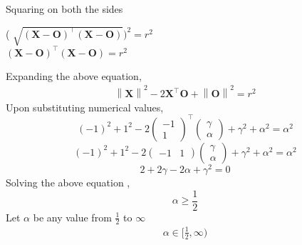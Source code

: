 \documentclass[10pt,a4paper]{report}
\newcommand{\myvec}[1]{\ensuremath{\begin{pmatrix}#1\end{pmatrix}}}
\let\vec\mathbf
\providecommand{\norm}[1]{\left\lVert#1\right\rVert}
\let\vec\mathbf
\providecommand{\brak}[1]{\ensuremath{\left(#1\right)}}
\begin{document}
\begin{multicols}{2}
{Squaring on both the sides \\ \vspace{2mm}
\begin{center}
( $ \sqrt{(\vec{X}-\vec{O})^{\top}(\vec{X}-\vec{O})} )^2 = r^2 $\\ \vspace{0.5cm}
$(\vec{X}-\vec{O})^{\top}(\vec{X}-\vec{O})=r^2$
\end{center}
Expanding the above equation,\\ \vspace{1mm}
\begin{align}
    \norm{\vec{X}}^2-2\vec{X}^{\top}\vec{O}+\norm{\vec{O}}^2=r^2
\end{align}
Upon substituting numerical values,
\begin{equation}
 (-1)^2+1^2-2 \myvec{-1 \\ 1}^{\top}\myvec{ \gamma \\ \alpha}+ \gamma^2 +\alpha^2 =\alpha^2 
 \end{equation}
 \begin{equation} 
 (-1)^2+1^2-2 \myvec{-1 & 1} \myvec{ \gamma \\ \alpha}+ \gamma^2 +\alpha^2 =\alpha^2 
 \end{equation}
 \begin{equation}
 2+2 \gamma-2\alpha+\gamma^2=0
 \end{equation}
Solving the above equation ,
\begin{equation}
\alpha \geq \frac{1}{2}
\end{equation}
Let $\alpha$ be any value from $\frac{1}{2}$ to $\infty$\\ \vspace{1mm}
\begin{align}
    \alpha \in [\frac{1}{2},\infty)
\end{align}
}
\end{multicols}
\end{document}
